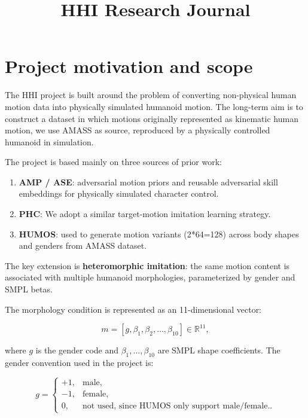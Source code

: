 \documentclass[11pt,a4paper]{article}
\title{HHI Research Journal}
\author{}
\date{}
\begin{document}
\maketitle

\section{Project motivation and scope}

The HHI project is built around the problem of converting non-physical human motion data into physically simulated humanoid motion. The long-term aim is to construct a dataset in which motions originally represented as kinematic human motion, we use AMASS as source, reproduced by a physically controlled humanoid in simulation.

The project is based mainly on three sources of prior work:

\begin{enumerate}
    \item \textbf{AMP / ASE}: adversarial motion priors and reusable adversarial skill embeddings for physically simulated character control.
    \item \textbf{PHC}: We adopt a similar target-motion imitation learning strategy.
    \item \textbf{HUMOS}: used to generate motion variants (2*64=128) across body shapes and genders from AMASS dataset.
\end{enumerate}

The key extension is \textbf{heteromorphic imitation}: the same motion content is associated with multiple humanoid morphologies, parameterized by gender and SMPL betas.

The morphology condition is represented as an 11-dimensional vector:

\begin{equation}
    m = [g, \beta_1, \beta_2, \dots, \beta_{10}] \in \mathbb{R}^{11},
\end{equation}

where $g$ is the gender code and $\beta_1, \dots, \beta_{10}$ are SMPL shape coefficients. The gender convention used in the project is:

\begin{equation}
    g =
    \begin{cases}
        +1, & \text{male},                                            \\
        -1, & \text{female},                                          \\
        0,  & \text{not used, since HUMOS only support male/female.}.
    \end{cases}
\end{equation}
\end{document}
